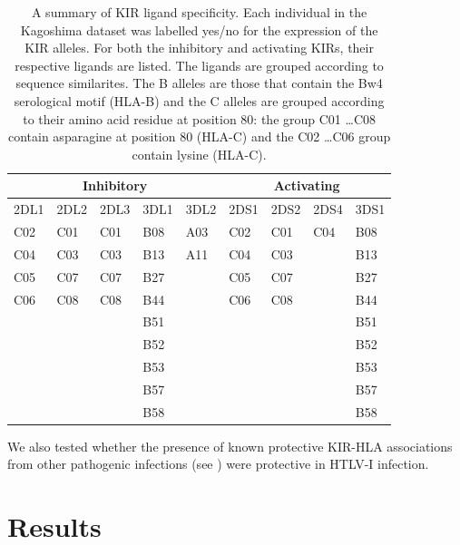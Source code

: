 \begin{table}[htp]
\begin{center}
\begin{tabular}{|l|l|l|l|l|l|l|l|l|}
\hline
\multicolumn{5}{|c|}{Inhibitory} & \multicolumn{4}{c|}{Activating} \bigstrut \\
\hline
2DL1 & 2DL2 & 2DL3 & 3DL1 & 3DL2 & 2DS1\footnotemark & 2DS2 & 2DS4 & 3DS1 \bigstrut \\
\hline
C02 & C01 & C01 & B08 & A03 & C02 & C01 & C04 & B08 \bigstrut[t] \\
C04 & C03 & C03 & B13 & A11 & C04 & C03 &     & B13 \\
C05 & C07 & C07 & B27 &     & C05 & C07 &     & B27 \\
C06 & C08 & C08 & B44 &     & C06 & C08 &     & B44 \\
    &     &     & B51 &     &     &     &     & B51 \\
    &     &     & B52 &     &     &     &     & B52 \\    
    &     &     & B53 &     &     &     &     & B53 \\
    &     &     & B57 &     &     &     &     & B57 \\
    &     &     & B58 &     &     &     &     & B58 \bigstrut[b] \\
\hline
\end{tabular}
\end{center}
\caption[A summary of KIR ligand specificity]{A summary of KIR ligand specificity. Each individual in the Kagoshima dataset was labelled yes/no for the expression of the KIR alleles. For both the inhibitory and activating KIRs, their respective ligands \citep{Carrington2009} are listed. The ligands are grouped according to sequence similarites. The B alleles are those that contain the Bw4 serological motif (HLA-B) and the C alleles are grouped according to their amino acid residue at position 80: the group C01 \ldots C08 contain asparagine at position 80 (HLA-C) and the C02 \ldots C06 group contain lysine (HLA-C).}
\label{chapter7/tableKirHla}
\end{table}


We also tested whether the presence of known protective KIR-HLA associations from other pathogenic infections (see ) were protective in HTLV-I infection.

\section{Results}

